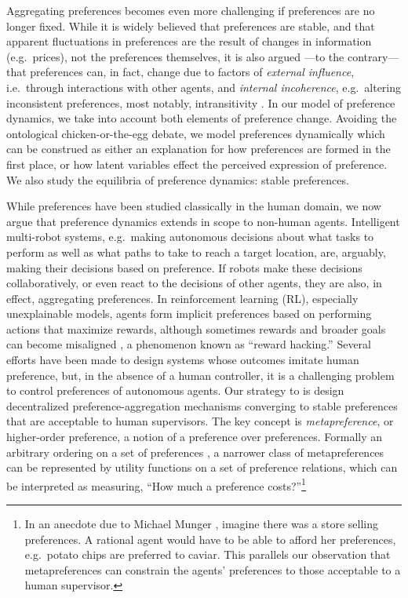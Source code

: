 \documentclass[conference]{ieeeconf}
\begin{document}
Aggregating preferences becomes even more challenging if preferences are no longer fixed. While it is widely believed \cite{stigler1977} that preferences are stable, and that apparent fluctuations in preferences are the result of changes in information (e.g.~prices), not the preferences themselves, it is also argued \cite{hansen1995}---to the contrary---that preferences can, in fact, change due to factors of \emph{external influence}, i.e.~through interactions with other agents, and \emph{internal incoherence}, e.g.~altering inconsistent preferences, most notably, intransitivity \cite{tversky1969}. In our model of preference dynamics, we take into account both elements of preference change. Avoiding the ontological chicken-or-the-egg debate, we model preferences dynamically which can be construed as either an explanation for how preferences are formed in the first place, or how latent variables effect the perceived expression of preference. We also study the equilibria of preference dynamics: stable preferences.

While preferences have been studied classically in the human domain, we now argue that preference dynamics extends in scope to non-human agents.
Intelligent multi-robot systems, e.g.~making autonomous decisions about what tasks to perform as well as what paths to take to reach a target location, are, arguably, making their decisions based on preference. If robots make these decisions collaboratively, or even react to the decisions of other agents, they are also, in effect, aggregating preferences. In reinforcement learning (RL), especially unexplainable models, agents form implicit preferences based on performing actions that maximize rewards, although sometimes rewards and broader goals can become misaligned \cite{pan2022}, a phenomenon known as ``reward hacking.'' Several efforts \cite{?} have been made to design systems whose outcomes imitate human preference, but, in the absence of a human controller, it is a challenging problem to control preferences of autonomous agents. Our strategy to is design decentralized preference-aggregation mechanisms converging to stable preferences that are acceptable to human supervisors. The key concept is \emph{metapreference},  or higher-order preference, a notion of a preference over preferences. Formally an arbitrary ordering on a set of preferences \cite{lutskanov2015}, a narrower class of metapreferences can be represented by utility functions on a set of preference relations, which can be interpreted as measuring, ``How much a preference costs?''\footnote{In an anecdote due to Michael Munger \cite{munger2019}, imagine there was a store selling preferences. A rational agent would have to be able to afford her preferences, e.g.~potato chips are preferred to  caviar. This parallels our observation that metapreferences can constrain the agents' preferences to those acceptable to a human supervisor.} 
\end{document}
